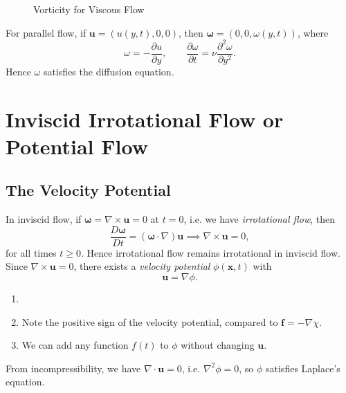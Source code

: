 \documentclass[12pt]{article}
\begin{document}
\begin{figure}[h]
	\centering
	\caption{Vorticity for Viscous Flow}
	\label{fig:viscous_vorticity}
\end{figure}

For parallel flow, if $\mathbf{u} = (u(y,t), 0, 0)$, then $\bm{\omega} = (0, 0, \omega(y,t))$, where
\[
\omega = - \frac{\partial u}{\partial y}, \qquad \frac{\partial \omega}{\partial t} = \nu \frac{\partial^2 \omega}{\partial y^2}.
\]
Hence $\omega$ satisfies the diffusion equation.

\newpage

\section{Inviscid Irrotational Flow or Potential Flow}
\label{sec:inviscid_irrotational_flow_or_potential_flow}

\subsection{The Velocity Potential}
\label{sub:the_velocity_potential}

In inviscid flow, if $\bm{\omega} = \nabla \times \mathbf{u} = 0$ at $t = 0$, i.e. we have \emph{irrotational flow}, then
\[
\frac{D \bm{\omega}}{Dt} = (\bm{\omega} \cdot \nabla) \mathbf{u} \implies \nabla \times \mathbf{u} = 0,
\]
for all times $t \geq 0$. Hence irrotational flow remains irrotational in inviscid flow. Since $\nabla \times \mathbf{u} = 0$, there exists a \emph{velocity potential} $\phi(\mathbf{x}, t)$ with
\[
\mathbf{u} = \nabla \phi.
\]
\begin{remark}
	\begin{enumerate}
		\item[]
		\item Note the positive sign of the velocity potential, compared to $\mathbf{f} = - \nabla \chi$.
		\item We can add any function $f(t)$ to $\phi$ without changing $\mathbf{u}$.
	\end{enumerate}
\end{remark}
From incompressibility, we have $\nabla \cdot \mathbf{u} = 0$, i.e. $\nabla^2 \phi = 0$, so $\phi$ satisfies Laplace's equation.
\end{document}
